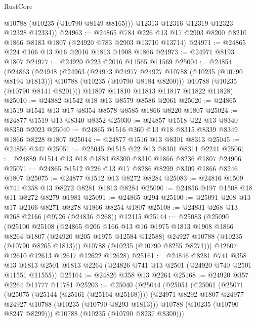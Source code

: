 \begin{lexlean}{RustCore}
\begin{coremodule}
          @10788
          (@10235 (@10790 @8149 @8165)))
        @12313
        @12316
        @12319
        @12323
        @12328
        @12334))
@24963 := @24865
    @784
    @226
    @13
    @17
    @2903
    @8200
    @8210
    @1866
    @8183
    @1807
    (@24920 @783 @2903 @13710 @13714)
@24971 := @24865 @224 @166 @13 @16 @2016 @1813 @1908 @1866
@24973 := @24971 @8193 @1807
@24977 := @24920 @223 @2016 @11565 @11569
@25004 := @24854
    (@24863
      (@24948
        (@24963
          (@24973 @24977 @24927 @10788 (@10235 (@10790 @8194 @1813)))
          @10788
          (@10235 (@10790 @8184 @8200)))
        @10788
        (@10235 (@10790 @8141 @8201)))
      @11807
      @11810
      @11813
      @11817
      @11822
      @11828)
@25010 := @24882 @1542 @18 @13 @8579 @8586 @2061
@25020 := @24865 @1519 @1541 @13 @17 @8354 @8578 @8585 @1866 @8220 @1807
@25024 := @24877 @1519 @13 @8340 @8352
@25030 := @24857 @1518 @22 @13 @8340 @8350 @2023
@25040 := @24865 @1516 @360 @13 @18 @8315 @8339 @8349 @1866 @8228 @1807
@25044 := @24877 @1516 @13 @8301 @8313
@25045 := @24856 @347
@25051 := @25045 @1515 @22 @13 @8301 @8311 @2241
@25061 := @24889 @1514 @13 @18 @1884 @8300 @8310 @1866 @8236 @1807 @24906
@25071 := @24865 @1512 @226 @13 @17 @8286 @8299 @8309 @1866 @8246 @1807
@25075 := @24877 @1512 @13 @8272 @8284
@25083 := @24816 @1509 @741 @358 @13 @8272 @8281 @1813 @8284
@25090 := @24856 @197 @1508 @18 @11 @8272 @8279 @1981
@25091 := @24865 @294
@25100 := @25091 @208 @13 @17 @2166 @8271 @8278 @1866 @8254 @1807
@25108 := @24831 @268 @13 @268 @2166 (@9726 (@24836 @268)) @12415
@25144 := @25083
    (@25090
      (@25100
        @25108
        (@24865
          @206
          @166
          @13
          @16
          @1975
          @1813
          @1908
          @1866
          @8264
          @1807
          (@24920 @205 @1975 @12584 @12588)
          @24927
          @10788
          (@10235 (@10790 @8265 @1813)))
        @10788
        (@10235 (@10790 @8255 @8271)))
      @12607
      @12610
      @12613
      @12617
      @12622
      @12628)
@25161 := @24846
    @8281
    @741
    @358
    @13
    @1813
    @2501
    @1813
    @2264
    (@24826 @741 @13 @2501 (@24920 @740 @2501 @11551 @11555))
@25164 := @24826 @358 @13 @2264
@25168 := @24920 @357 @2264 @11777 @11781
@25203 := @25040
    (@25044
      (@25051
        (@25061
          (@25071
            (@25075 (@25144 (@25161 (@25164 @25168))))
            (@24971 @8292 @1807 @24977 @24927 @10788 (@10235 (@10790 @8293 @1813)))
            @10788
            (@10235 (@10790 @8247 @8299)))
          @10788
          (@10235 (@10790 @8237 @8300)))

\end{coremodule}
\end{lexlean}
